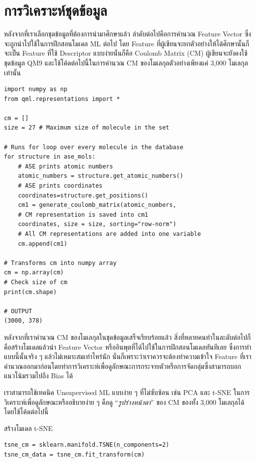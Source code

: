 \section{การวิเคราะห์ชุดข้อมูล}
\label{sec:dataset_analysis}

หลังจากที่เราเลือกชุดข้อมูลที่ต้องการนำมาศึกษาแล้ว ลำดับต่อไปคือการคำนวณ Feature Vector ซึ่งจะถูกนำไปใช้ในการฝึกสอนโมเดล ML ต่อไป
โดย Feature ที่ผู้เขียนจะยกตัวอย่างให้ได้ศึกษานั้นก็จะเป็น Feature ที่ใช้ Descriptor แบบง่ายนั่นก็คือ Coulomb Matrix (CM)
ผู้เขียนจะยังคงใช้ชุดข้อมูล QM9 และใช้โค้ดต่อไปนี้ในการคำนวณ CM ของโมเลกุลตัวอย่างเพียงแค่ 3,000 โมเลกุลเท่านั้น

\begin{lstlisting}[style=MyPython]
import numpy as np
from qml.representations import * 

cm = []
size = 27 # Maximum size of molecule in the set

# Runs for loop over every molecule in the database
for structure in ase_mols: 
    # ASE prints atomic numbers 
    atomic_numbers = structure.get_atomic_numbers() 
    # ASE prints coordinates
    coordinates=structure.get_positions() 
    cm1 = generate_coulomb_matrix(atomic_numbers,
    # CM representation is saved into cm1
    coordinates, size = size, sorting="row-norm") 
    # All CM representations are added into one variable
    cm.append(cm1) 

# Transforms cm into numpy array
cm = np.array(cm) 
# Check size of cm
print(cm.shape)

# OUTPUT
(3000, 378)
\end{lstlisting}

หลังจากที่เราคำนวณ CM ของโมเลกุลในชุดข้อมูลเสร็จเรียบร้อยแล้ว สิ่งที่หลายคนทำในละดับต่อไปก็คือสร้างโมเดลแล้วนำ Feature Vector 
หรืออินพุตที่ได้ไปใช้ในการฝึกสอนโมเดลทันทีเลย ซึ่งการทำแบบนี้นั้นจริง ๆ แล้วไม่เหมาะสมเท่าไหร่นัก นั่นก็เพราะว่าเราควรจะต้องทำความเข้าใจ 
Feature ที่เราคำนวณออกมาก่อนโดยทำการวิเคราะห์เพื่อดูลักษณะการกระจายตัวหรือการจัดกลุ่มซึ่งสามารถบอกแนวโน้มรวมไปถึง Bias ได้

เราสามารถใช้เทคนิค Unsupervised ML แบบง่าย ๆ ที่ไม่ซับซ้อน เช่น PCA และ t-SNE ในการวิเคราะห์เพื่อดูลักษณะหรืออธิบายง่าย ๆ คือดู 
\enquote{\textit{รูปร่างหน้าตา}} ของ CM ของทั้ง 3,000 โมเลกุลได้โดยใช้โค้ดต่อไปนี้

\noindent สร้างโมเดล t-SNE
\begin{lstlisting}[style=MyPython]
tsne_cm = sklearn.manifold.TSNE(n_components=2)
tsne_cm_data = tsne_cm.fit_transform(cm)
\end{lstlisting}

